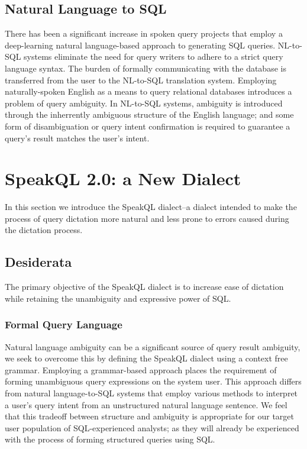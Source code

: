 \subsection{Natural Language to SQL}

There has been a significant increase in spoken query projects that employ a deep-learning natural language-based approach to generating SQL queries\cite{Kim2020}. NL-to-SQL systems eliminate the need for query writers to adhere to a strict query language syntax. The burden of formally communicating with the database is transferred from the user to the NL-to-SQL translation system. Employing naturally-spoken English as a means to query relational databases introduces a problem of query ambiguity. In NL-to-SQL systems, ambiguity is introduced through the inherrently ambiguous structure of the English language; and some form of disambiguation or query intent confirmation is required to guarantee a query's result matches the user's intent.



\section{SpeakQL 2.0: a New Dialect}


In this section we introduce the SpeakQL dialect--a dialect intended to make the process of query dictation more natural and less prone to errors caused during the dictation process.

\subsection{Desiderata}

The primary objective of the SpeakQL dialect is to increase ease of dictation while retaining the unambiguity and expressive power of SQL.

\subsubsection{Formal Query Language} 

Natural language ambiguity can be a significant source of query result ambiguity, we seek to overcome this by defining the SpeakQL dialect using a context free grammar. Employing a grammar-based approach places the requirement of forming unambiguous query expressions on the system user. This approach differs from natural language-to-SQL systems that employ various methods to interpret a user's query intent from an unstructured natural language sentence. We feel that this tradeoff between structure and ambiguity is appropriate for our target user population of SQL-experienced analysts; as they will already be experienced with the process of forming structured queries using SQL.


